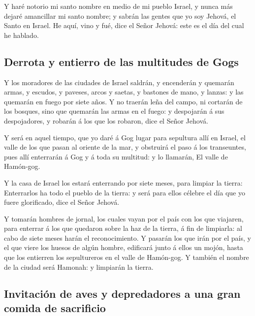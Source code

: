  Y haré notorio mi santo nombre en medio de mi pueblo
Israel, y nunca más dejaré amancillar mi santo nombre; y sabrán las
gentes que yo soy Jehová, el Santo en Israel.  He aquí, vino
y fué, dice el Señor Jehová: este es el día del cual he hablado.

\hypertarget{derrota-y-entierro-de-las-multitudes-de-gogs}{%
\subsection{Derrota y entierro de las multitudes de
Gogs}\label{derrota-y-entierro-de-las-multitudes-de-gogs}}

 Y los moradores de las ciudades de Israel saldrán, y
encenderán y quemarán armas, y escudos, y paveses, arcos y saetas, y
bastones de mano, y lanzas: y las quemarán en fuego por siete años.
 Y no traerán leña del campo, ni cortarán de los bosques,
sino que quemarán las armas en el fuego: y despojarán á sus
despojadores, y robarán á los que los robaron, dice el Señor Jehová.

 Y será en aquel tiempo, que yo daré á Gog lugar para
sepultura allí en Israel, el valle de los que pasan al oriente de la
mar, y obstruirá el paso á los transeuntes, pues allí enterrarán á Gog y
á toda su multitud: y lo llamarán, El valle de Hamón-gog.

 Y la casa de Israel los estará enterrando por siete meses,
para limpiar la tierra:  Enterrarlos ha todo el pueblo de
la tierra: y será para ellos célebre el día que yo fuere glorificado,
dice el Señor Jehová.

 Y tomarán hombres de jornal, los cuales vayan por el país
con los que viajaren, para enterrar á los que quedaron sobre la haz de
la tierra, á fin de limpiarla: al cabo de siete meses harán el
reconocimiento.  Y pasarán los que irán por el país, y el
que viere los huesos de algún hombre, edificará junto á ellos un mojón,
hasta que los entierren los sepultureros en el valle de Hamón-gog.
 Y también el nombre de la ciudad será Hamonah: y limpiarán
la tierra.

\hypertarget{invitaciuxf3n-de-aves-y-depredadores-a-una-gran-comida-de-sacrificio}{%
\subsection{Invitación de aves y depredadores a una gran comida de
sacrificio}\label{invitaciuxf3n-de-aves-y-depredadores-a-una-gran-comida-de-sacrificio}}

